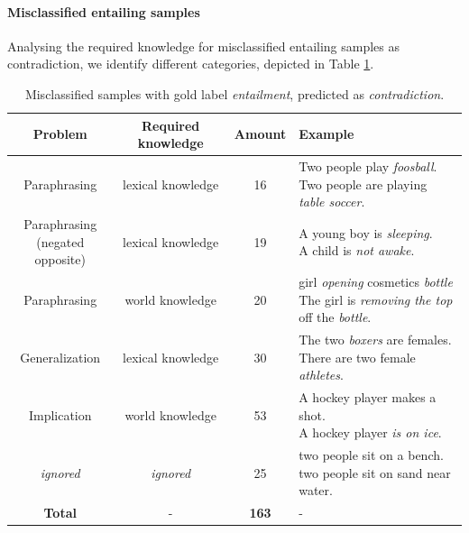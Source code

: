 \paragraph*{Misclassified entailing samples}
Analysing the required knowledge for misclassified entailing samples as contradiction, we identify different categories, depicted in Table \ref{tab:misclassified_orig_ent}.
\begin{table}[tph!]
\centering
\begin{tabular}{cccl}
\textbf{Problem} & \textbf{Required knowledge} & \textbf{Amount} & \textbf{Example} \\
\toprule
Paraphrasing & lexical knowledge & 16 & \specialcell{Two people play \textit{foosball}.\\Two people are playing \textit{table soccer}.}\\
\specialcellc{Paraphrasing\\(negated opposite)} & lexical knowledge & 19 & \specialcell{A young boy is \textit{sleeping}.\\A child is \textit{not awake}.}\\
Paraphrasing & world knowledge & 20 & \specialcell{girl \textit{opening} cosmetics \textit{bottle}\\The girl is \textit{removing the top} off the \textit{bottle}.}\\
Generalization & lexical knowledge & 30 & \specialcell{The two \textit{boxers} are females.\\There are two female \textit{athletes}.}\\
Implication & world knowledge & 53 & \specialcell{A hockey player makes a shot.\\A hockey player \textit{is on ice}.}\\
\midrule
\textit{ignored} & \textit{ignored} & 25 & \specialcell{two people sit on a bench.\\two people sit on sand near water.} \\
\midrule
\textbf{Total} & - & \textbf{163} & - \\
\bottomrule      
\end{tabular}
\caption{Misclassified samples with gold label \textit{entailment}, predicted as \textit{contradiction}.}
\label{tab:misclassified_orig_ent}
\end{table}
